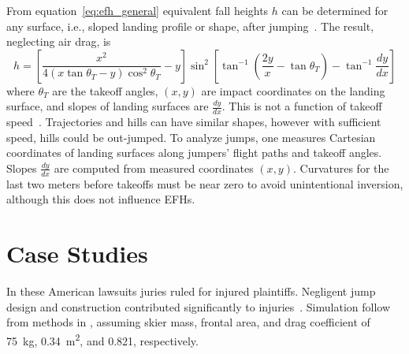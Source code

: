 \documentclass[smallextended]{svjour3}       %
\begin{document}
From equation~\ref{eq:efh_general} equivalent fall heights $h$ can be
determined for any surface, i.e., sloped landing profile or shape, after
jumping~\cite{Petrone2017}. The result, neglecting air drag, is
%
\begin{equation}
  h = \left[\frac{x^2}{4(x\tan\theta_T - y)\cos^{2}\theta_T} -
    y\right]\sin^{2}\left[\tan^{-1}\left(\frac{2y}{x}- \tan\theta_T\right) -
    \tan^{-1}\frac{dy}{dx}\right]
  \label{eq:efh}
\end{equation}
%
where $\theta_T$ are the takeoff angles, $(x,y)$ are impact coordinates on the
landing surface, and slopes of landing surfaces are $\frac{dy}{dx}$. This is
not a function of takeoff speed~\cite{Petrone2017}. Trajectories and hills can
have similar shapes, however with sufficient speed, hills could be out-jumped.
To analyze jumps, one measures Cartesian coordinates of landing surfaces along
jumpers' flight paths and takeoff angles. Slopes $\frac{dy}{dx}$ are computed
from measured coordinates $(x,y)$. Curvatures for the last two meters before
takeoffs must be near zero to avoid unintentional inversion, although this does
not influence EFHs.

\section{Case Studies}
\label{sec:case}
%
In these American lawsuits juries ruled for injured plaintiffs. Negligent jump
design and construction contributed significantly to
injuries~\cite{SuperiorCourtSanFranciscoCounty2002,KingCountySuperiorCourt2008}.
Simulation follow from methods in \cite{Levy2015}, assuming skier mass, frontal
area, and drag coefficient of 75~\si{\kg}, 0.34~\si{\meter\squared}, and 0.821,
respectively.
\end{document}
